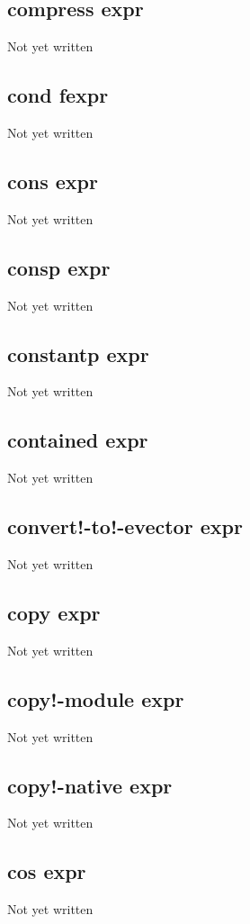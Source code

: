 \documentclass[a4paper,11pt]{article}
\begin{document}
{\subsection{\ttfamily compress expr}
Not yet written

\subsection{\ttfamily cond fexpr}
Not yet written

\subsection{\ttfamily cons expr}
Not yet written

\subsection{\ttfamily consp expr}
Not yet written

\subsection{\ttfamily constantp expr}
Not yet written

\subsection{\ttfamily contained expr}
Not yet written

\subsection{\ttfamily convert!-to!-evector expr}
Not yet written

\subsection{\ttfamily copy expr}
Not yet written

\subsection{\ttfamily copy!-module expr}
Not yet written

\subsection{\ttfamily copy!-native expr}
Not yet written

\subsection{\ttfamily cos expr}
Not yet written

}
\end{document}
